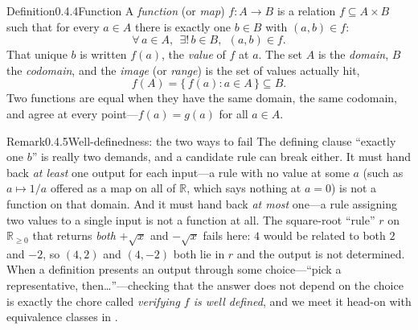 \documentclass[main.tex]{subfiles}
\begin{document}
\begin{Obj}{Definition}{0.4.4}{Function}
A \emph{function} (or \emph{map}) $f\colon A\to B$ is a relation $f\subseteq A\times B$ such that for
every $a\in A$ there is exactly one $b\in B$ with $(a,b)\in f$:
\[
\forall\,a\in A,\ \ \exists!\,b\in B,\ \ (a,b)\in f.
\]
That unique $b$ is written $f(a)$, the \emph{value} of $f$ at $a$. The set $A$ is the \emph{domain},
$B$ the \emph{codomain}, and the \emph{image} (or \emph{range}) is the set of values actually hit,
\[
f(A)=\{\,f(a) : a\in A\,\}\subseteq B.
\]
Two functions are equal when they have the same domain, the same codomain, and agree at every
point---$f(a)=g(a)$ for all $a\in A$.
\end{Obj}

\begin{ObjL}{Remark}{0.4.5}{Well-definedness: the two ways to fail}
The defining clause ``exactly one $b$'' is really two demands, and a candidate rule can break either.
It must hand back \emph{at least} one output for each input---a rule with no value at some $a$ (such as
$a\mapsto 1/a$ offered as a map on all of $\mathbb R$, which says nothing at $a=0$) is not a function
on that domain. And it must hand back \emph{at most} one---a rule assigning two values to a single
input is not a function at all. The square-root ``rule'' $r$ on $\mathbb R_{\ge 0}$ that returns
\emph{both} $+\sqrt x$ and $-\sqrt x$ fails here: $4$ would be related to both $2$ and $-2$, so
$(4,2)$ and $(4,-2)$ both lie in $r$ and the output is not determined. When a definition presents an
output through some choice---``pick a representative, then\dots''---checking that the answer does not
depend on the choice is exactly the chore called \emph{verifying $f$ is well defined}, and we meet it
head-on with equivalence classes in .
\end{ObjL}
\end{document}
